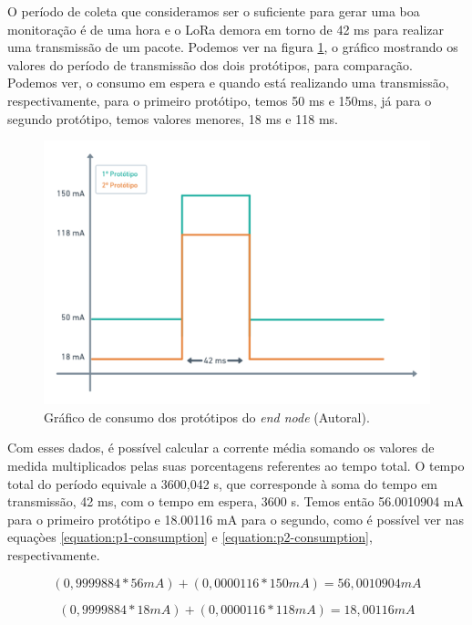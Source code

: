 O período de coleta que consideramos ser o suficiente para gerar uma boa monitoração é de uma hora e o LoRa demora em torno de 42 ms para realizar uma transmissão de um pacote. Podemos ver na figura \ref{fig:end-node-consumption-chart}, o gráfico mostrando os valores do período de transmissão dos dois protótipos, para comparação. Podemos ver, o consumo em espera e quando está realizando uma transmissão, respectivamente, para o primeiro protótipo, temos 50 ms e 150ms, já para o segundo protótipo, temos valores menores, 18 ms e 118 ms.

\begin{figure}[H]
  \centering
  \includegraphics[width=.80\textwidth]{assets/end-node-consumption-chart.png} 
  \caption{Gráfico de consumo dos protótipos do \textit{end node} (Autoral).}
  \label{fig:end-node-consumption-chart} 
\end{figure}

Com esses dados, é possível calcular a corrente média somando os valores de medida multiplicados pelas suas porcentagens referentes ao tempo total. O tempo total do período equivale a 3600,042 s, que corresponde à soma do tempo em transmissão, 42 ms, com o tempo em espera, 3600 s. Temos então 56.0010904 mA para o primeiro protótipo e 18.00116 mA para o segundo, como é possível ver nas equaçòes \ref{equation:p1-consumption} e \ref{equation:p2-consumption}, respectivamente.

\begin{equation}
  (0,9999884 * 56 mA) + (0,0000116 * 150 mA) = 56,0010904 mA
  \label{equation:p1-consumption} 
\end{equation}

\begin{equation}
  (0,9999884 * 18 mA) + (0,0000116 * 118 mA) = 18,00116 mA
  \label{equation:p2-consumption} 
\end{equation}

